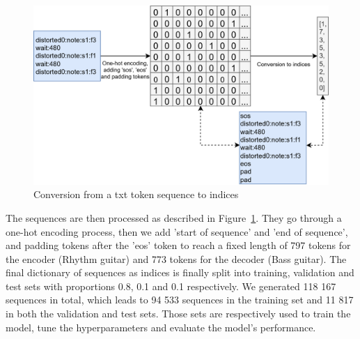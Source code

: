 \begin{figure}[!ht]
    \centering
    \includegraphics[width=.8\linewidth]{../images-figures/conversion_indices.png}
    \caption{Conversion from a txt token sequence to indices}
    \label{fig:conversion_indices}
\end{figure}

The sequences are then processed as described in Figure~\ref{fig:conversion_indices}.
They go through a one-hot encoding process, then we add 'start of sequence' and 'end of sequence',
and padding tokens after the 'eos' token to reach a fixed length of 797 tokens for the encoder (Rhythm guitar) and 773 tokens for the decoder (Bass guitar).
The final dictionary of sequences as indices is finally split into training, validation and test sets with proportions 0.8, 0.1 and 0.1 respectively.
We generated 118 167 sequences in total, which leads to 94 533 sequences in the training set and 11 817 in both the validation and test sets.
Those sets are respectively used to train the model, tune the hyperparameters and evaluate the model's performance.

